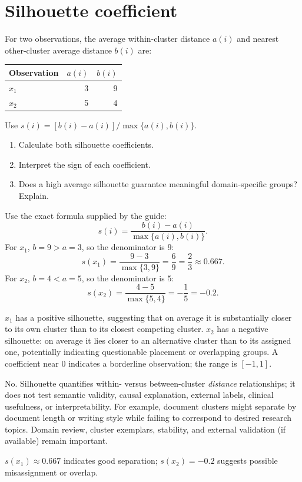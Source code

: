 \section{Silhouette coefficient}
\label{sec:ex7}
\begin{problem}
For two observations, the average within-cluster distance $a(i)$ and nearest other-cluster average distance $b(i)$ are:
\begin{center}\begin{tabular}{@{}lrr@{}}\toprule Observation&$a(i)$&$b(i)$\\\midrule $x_1$&3&9\\$x_2$&5&4\\\bottomrule\end{tabular}\end{center}
Use $s(i)=[b(i)-a(i)]/\max\{a(i),b(i)\}$.
\begin{enumerate}[label=\textbf{(\alph*)}]
\item Calculate both silhouette coefficients.
\item Interpret the sign of each coefficient.
\item Does a high average silhouette guarantee meaningful domain-specific groups? Explain.
\end{enumerate}
\end{problem}


Use the exact formula supplied by the guide:
\[
s(i)=\frac{b(i)-a(i)}{\max\{a(i),b(i)\}}.
\]
For $x_1$, $b=9>a=3$, so the denominator is $9$:
\[
s(x_1)=\frac{9-3}{\max\{3,9\}}=\frac{6}{9}
=\boxed{\frac{2}{3}\approx0.667}.
\]
For $x_2$, $b=4<a=5$, so the denominator is $5$:
\[
s(x_2)=\frac{4-5}{\max\{5,4\}}=-\frac15
=\boxed{-0.2}.
\]

$x_1$ has a positive silhouette, suggesting that on average it is substantially closer to its own cluster than to its closest competing cluster. $x_2$ has a negative silhouette: on average it lies closer to an alternative cluster than to its assigned one, potentially indicating questionable placement or overlapping groups. A coefficient near $0$ indicates a borderline observation; the range is $[-1,1]$.

No. Silhouette quantifies within- versus between-cluster \emph{distance} relationships; it does not test semantic validity, causal explanation, external labels, clinical usefulness, or interpretability. For example, document clusters might separate by document length or writing style while failing to correspond to desired research topics. Domain review, cluster exemplars, stability, and external validation (if available) remain important.
\begin{answer}
$\boxed{s(x_1)\approx0.667}$ indicates good separation; $\boxed{s(x_2)=-0.2}$ suggests possible misassignment or overlap.
\end{answer}


